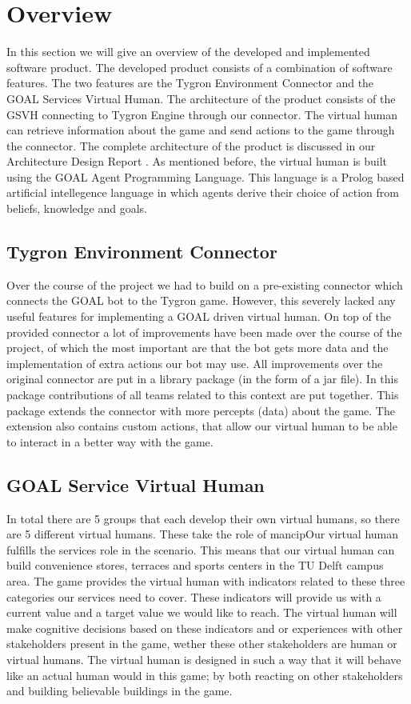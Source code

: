 \section{Overview}
In this section we will give an overview of the developed and implemented software product. The developed product consists of a combination of software features. The two features are the Tygron Environment Connector  and the GOAL Services Virtual Human. The architecture of the product consists of the GSVH connecting to Tygron Engine through our connector. The virtual human can retrieve information about the game and send actions to the game through the connector. The complete architecture of the product is discussed in our Architecture Design Report \cite{CTD16}. As mentioned before, the virtual human is built using the GOAL Agent Programming Language\cite{GOAL16}. This language is a Prolog based artificial intellegence language in which agents derive their choice of action from beliefs, knowledge and goals.

\subsection{Tygron Environment Connector}
Over the course of the project we had to build on a pre-existing connector which connects the GOAL bot to the Tygron game. However, this severely lacked any useful features for implementing a GOAL driven virtual human. On top of the provided connector a lot of improvements have been made over the course of the project, of which the most important are that the bot gets more data and the implementation of extra actions our bot may use. All improvements over the original connector are put in a library package (in the form of a jar file). In this package contributions of all teams related to this context are put together. This package extends the connector with more percepts (data) about the game. The extension also contains custom actions, that allow our virtual human to be able to interact in a better way with the game. 

\subsection{GOAL Service Virtual Human}
In total there are 5 groups that each develop their own virtual humans, so there are 5 different virtual humans. These take the role of mancipOur virtual human fulfills the services role in the scenario. This means that our virtual human can build convenience stores, terraces and sports centers in the TU Delft campus area. The game provides the virtual human with indicators related to these three categories our services need to cover. These indicators will provide us with a current value and a target value we would like to reach. The virtual human will make cognitive decisions based on these indicators and or experiences with other stakeholders present in the game, wether these other stakeholders are human or virtual humans. The virtual human is designed in such a way that it will behave like an actual human would in this game; by both reacting on other stakeholders and building believable buildings in the game.